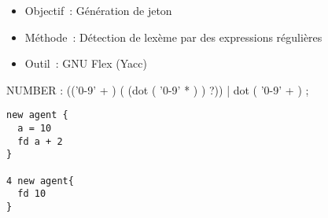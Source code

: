 \begin{frame}
	\begin{itemize}
		\item Objectif~: Génération de jeton
		\item Méthode~: Détection de lexème par des expressions régulières
		\item Outil~: GNU Flex (Yacc)
	\end{itemize}
\end{frame}

\begin{frame}[fragile]
	\begin{rail}
		NUMBER : (('0-9' + ) ( (dot ( '0-9' * ) ) ?))
		| dot ( '0-9' + ) ;
	\end{rail}
\end{frame}

\begin{frame}[fragile]
	\begin{lstlisting}[language=Stibbons]
new agent {
  a = 10
  fd a + 2
}

4 new agent{
  fd 10
}
	\end{lstlisting}
\end{frame}
